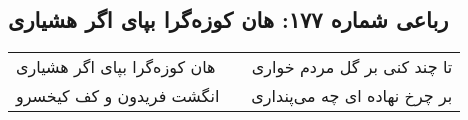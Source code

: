 \begin{center}
\section*{رباعی شماره ۱۷۷: هان کوزه‌گرا بپای اگر هشیاری}
\label{sec:sh177}
\begin{longtable}{l p{0.5cm} r}
هان کوزه‌گرا بپای اگر هشیاری
&&
تا چند کنی بر گل مردم خواری
\\
انگشت فریدون و کف کیخسرو
&&
بر چرخ نهاده ای چه می‌پنداری
\\
\end{longtable}
\end{center}
